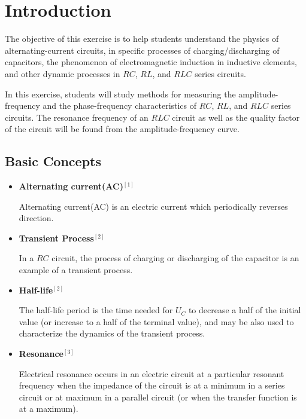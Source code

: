\documentclass[a4paper]{article}
\begin{document}


\newpage
\tableofcontents
\setcounter{page}{1}

\newpage
\listoffigures
\listoftables

\newpage
\section{Introduction}

The objective of this exercise is to help students understand the physics of alternating-current circuits, in specific processes of charging/discharging of capacitors, the phenomenon of electromagnetic induction in inductive elements, and other dynamic processes in $RC$, $RL$, and $RLC$ series circuits.

In this exercise, students will study methods for measuring the amplitude-frequency and the phase-frequency characteristics of $RC$, $RL$, and $RLC$ series circuits.  The resonance frequency of an $RLC$ circuit as well as the quality factor of the circuit will be found from the amplitude-frequency curve.

\subsection{Basic Concepts}
\begin{itemize}
	\item \textbf{Alternating current(AC)}$^{[1]}$

	      Alternating current(AC) is an electric current which periodically reverses direction.

	\item \textbf{Transient Process}$^{[2]}$

	      In a $RC$ circuit, the process of charging or discharging of the capacitor is an example of a transient process.

	\item \textbf{Half-life}$^{[2]}$

	      The half-life period is the time needed for $U_C$ to decrease a half of the initial value (or increase to a half of the terminal value), and may be also used to characterize the dynamics of the transient process.

	\item \textbf{Resonance}$^{[3]}$

	      Electrical resonance occurs in an electric circuit at a particular resonant frequency when the impedance of the circuit is at a minimum in a series circuit or at maximum in a parallel circuit (or when the transfer function is at a maximum).
\end{itemize}
\end{document}
